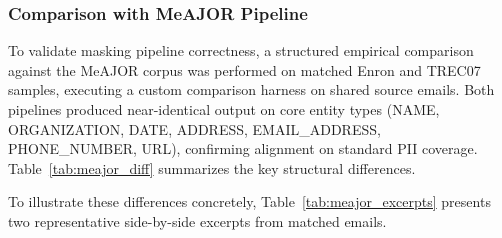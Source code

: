 \documentclass[journal]{IEEEtran}
\begin{document}
\subsubsection{Comparison with MeAJOR Pipeline}
To validate masking pipeline correctness, a structured empirical comparison against the MeAJOR corpus \cite{meajor2025corpus} was performed on matched Enron and TREC07 samples, executing a custom comparison harness on shared source emails. Both pipelines produced near-identical output on core entity types (NAME, ORGANIZATION, DATE, ADDRESS, EMAIL\_ADDRESS, PHONE\_NUMBER, URL), confirming alignment on standard PII coverage. Table~\ref{tab:meajor_diff} summarizes the key structural differences.

\begin{table}[!htbp]
\caption{Anti-PLUTO vs. MeAJOR Masking Pipeline: Key Structural Differences}
\label{tab:meajor_diff}
\centering
{}
\end{table}

To illustrate these differences concretely, Table~\ref{tab:meajor_excerpts} presents two representative side-by-side excerpts from matched emails.
\end{document}
